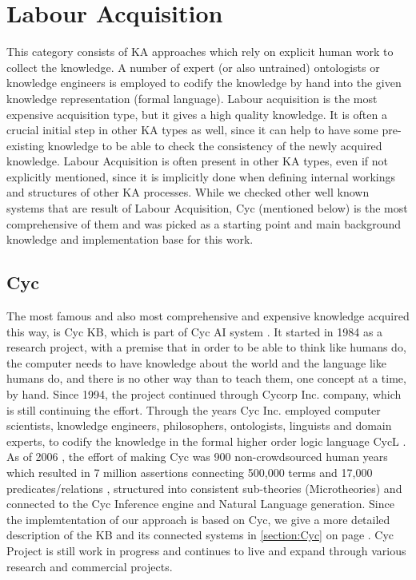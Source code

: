 \section{Labour Acquisition}
\label{section:LabourAcquisition}
This category consists of KA approaches which rely on explicit human work to 
collect the knowledge. A number of expert (or also untrained) ontologists or 
knowledge engineers is employed to codify the knowledge by hand into the given 
knowledge representation (formal language). Labour acquisition is the most 
expensive acquisition type, but it gives a high quality knowledge. It is often a
crucial initial step in other KA types as well, since it can help to have some 
pre-existing knowledge to be able to check the consistency of the newly acquired
knowledge. Labour Acquisition is often present in other KA types, even if not 
explicitly mentioned, since it is implicitly done when defining internal 
workings and structures of other KA processes. While we checked other well 
known systems that are result of Labour Acquisition, Cyc (mentioned below) is 
the most comprehensive of them and was picked as a starting point and main 
background knowledge and implementation base for this work.

\subsection{Cyc} The most famous and also most comprehensive and expensive 
knowledge acquired this way, is Cyc KB, which is part of Cyc AI system 
\parencite{Lenat1995}. It started in 1984 as a research project, with a premise 
that in order to be able to think like humans do, the computer needs to have 
knowledge about the world and the language like humans do, and there is no other
way than to teach them, one concept at a time, by hand. Since 1994, the project 
continued through Cycorp Inc. company, which is still continuing the effort. 
Through the years Cyc Inc. employed computer scientists, knowledge engineers, 
philosophers, ontologists, linguists and domain experts, to codify the knowledge
in the formal higher order logic language CycL \parencite{Matuszek2006a}. As of 
2006 \parencite{Matuszek2006}, the effort of making Cyc was 900 non-crowdsourced 
human years which resulted in 7 million assertions connecting 500,000 terms and 
17,000 predicates/relations \parencite{Zang2013}, structured into consistent 
sub-theories (Microtheories) and connected to the Cyc Inference engine and 
Natural Language generation. Since the implemtentation of our approach is based
on Cyc, we give a more detailed description of the KB and its connected systems
in \autoref{section:Cyc} on page \pageref{section:Cyc}. Cyc Project is still 
work in progress and continues to live and expand through various research and
commercial projects.

